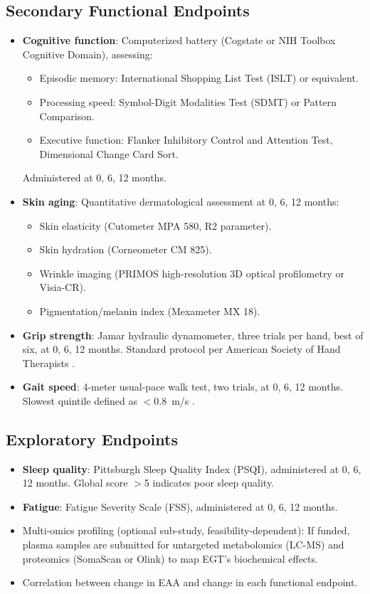 \documentclass[11pt,a4paper]{article}
\begin{document}
\subsection{Secondary Functional Endpoints}

\begin{itemize}[nosep]
  \item \textbf{Cognitive function}: Computerized battery (Cogstate or NIH Toolbox Cognitive Domain), assessing:
    \begin{itemize}[nosep]
      \item Episodic memory: International Shopping List Test (ISLT) or equivalent.
      \item Processing speed: Symbol-Digit Modalities Test (SDMT) or Pattern Comparison.
      \item Executive function: Flanker Inhibitory Control and Attention Test, Dimensional Change Card Sort.
    \end{itemize}
    Administered at 0, 6, 12 months.
  \item \textbf{Skin aging}: Quantitative dermatological assessment at 0, 6, 12 months:
    \begin{itemize}[nosep]
      \item Skin elasticity (Cutometer MPA 580, R2 parameter).
      \item Skin hydration (Corneometer CM 825).
      \item Wrinkle imaging (PRIMOS high-resolution 3D optical profilometry or Visia-CR).
      \item Pigmentation/melanin index (Mexameter MX 18).
    \end{itemize}
  \item \textbf{Grip strength}: Jamar hydraulic dynamometer, three trials per hand, best of six, at 0, 6, 12 months. Standard protocol per American Society of Hand Therapists \cite{bohannon2012}.
  \item \textbf{Gait speed}: 4-meter usual-pace walk test, two trials, at 0, 6, 12 months. Slowest quintile defined as $<$0.8~m/s \cite{studenski2003}.
\end{itemize}

\subsection{Exploratory Endpoints}

\begin{itemize}[nosep]
  \item \textbf{Sleep quality}: Pittsburgh Sleep Quality Index (PSQI), administered at 0, 6, 12 months. Global score $>$5 indicates poor sleep quality.
  \item \textbf{Fatigue}: Fatigue Severity Scale (FSS), administered at 0, 6, 12 months.
  \item Multi-omics profiling (optional sub-study, feasibility-dependent): If funded, plasma samples are submitted for untargeted metabolomics (LC-MS) and proteomics (SomaScan or Olink) to map EGT's biochemical effects.
  \item Correlation between change in EAA and change in each functional endpoint.
\end{itemize}
\end{document}
